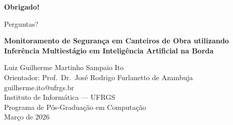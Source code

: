 {
\begin{frame}[plain]
  \vfill
  \begin{center}
    {\fontsize{40}{44}\selectfont\color{stagecolor}\textbf{Obrigado!}}

    \vspace{8mm}

    {\Large\color{arrowcolor} Perguntas?}

    \vspace{10mm}

    {\small\color{stagecolor}\textbf{Monitoramento de Segurança em Canteiros de Obra utilizando\\
    Inferência Multiestágio em Inteligência Artificial na Borda}}

    \vspace{8mm}

    {\normalsize Luiz Guilherme Martinho Sampaio Ito}\\[3pt]
    {\small\color{arrowcolor} Orientador: Prof.~Dr.~José Rodrigo Furlanetto de Azambuja}\\[6pt]
    {\footnotesize\color{inputcolor} guilherme.ito@ufrgs.br}\\[8pt]
    {\footnotesize Instituto de Informática --- UFRGS\\
    Programa de Pós-Graduação em Computação\\[2pt]
    Março de 2026}
  \end{center}
  \vfill
\end{frame}
}
